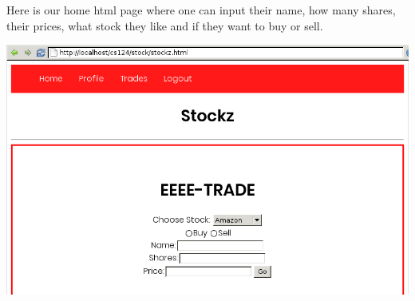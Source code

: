 Here is our home html page where one can input their name, how many shares, their prices, what stock they like and if they want to buy or sell.

 
\includegraphics[scale=0.5]{../test1.png}
 